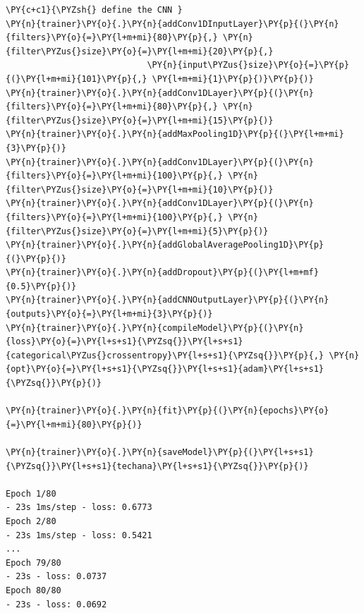 \begin{tcolorbox}[breakable, size=fbox, boxrule=1pt, pad at break*=1mm,colback=cellbackground, colframe=cellborder]
\begin{Verbatim}[commandchars=\\\{\}]
\PY{c+c1}{\PYZsh{} define the CNN }
\PY{n}{trainer}\PY{o}{.}\PY{n}{addConv1DInputLayer}\PY{p}{(}\PY{n}{filters}\PY{o}{=}\PY{l+m+mi}{80}\PY{p}{,} \PY{n}{filter\PYZus{}size}\PY{o}{=}\PY{l+m+mi}{20}\PY{p}{,} 
                            \PY{n}{input\PYZus{}size}\PY{o}{=}\PY{p}{(}\PY{l+m+mi}{101}\PY{p}{,} \PY{l+m+mi}{1}\PY{p}{)}\PY{p}{)}
\PY{n}{trainer}\PY{o}{.}\PY{n}{addConv1DLayer}\PY{p}{(}\PY{n}{filters}\PY{o}{=}\PY{l+m+mi}{80}\PY{p}{,} \PY{n}{filter\PYZus{}size}\PY{o}{=}\PY{l+m+mi}{15}\PY{p}{)}
\PY{n}{trainer}\PY{o}{.}\PY{n}{addMaxPooling1D}\PY{p}{(}\PY{l+m+mi}{3}\PY{p}{)}
\PY{n}{trainer}\PY{o}{.}\PY{n}{addConv1DLayer}\PY{p}{(}\PY{n}{filters}\PY{o}{=}\PY{l+m+mi}{100}\PY{p}{,} \PY{n}{filter\PYZus{}size}\PY{o}{=}\PY{l+m+mi}{10}\PY{p}{)}
\PY{n}{trainer}\PY{o}{.}\PY{n}{addConv1DLayer}\PY{p}{(}\PY{n}{filters}\PY{o}{=}\PY{l+m+mi}{100}\PY{p}{,} \PY{n}{filter\PYZus{}size}\PY{o}{=}\PY{l+m+mi}{5}\PY{p}{)}
\PY{n}{trainer}\PY{o}{.}\PY{n}{addGlobalAveragePooling1D}\PY{p}{(}\PY{p}{)}
\PY{n}{trainer}\PY{o}{.}\PY{n}{addDropout}\PY{p}{(}\PY{l+m+mf}{0.5}\PY{p}{)}
\PY{n}{trainer}\PY{o}{.}\PY{n}{addCNNOutputLayer}\PY{p}{(}\PY{n}{outputs}\PY{o}{=}\PY{l+m+mi}{3}\PY{p}{)}
\PY{n}{trainer}\PY{o}{.}\PY{n}{compileModel}\PY{p}{(}\PY{n}{loss}\PY{o}{=}\PY{l+s+s1}{\PYZsq{}}\PY{l+s+s1}{categorical\PYZus{}crossentropy}\PY{l+s+s1}{\PYZsq{}}\PY{p}{,} \PY{n}{opt}\PY{o}{=}\PY{l+s+s1}{\PYZsq{}}\PY{l+s+s1}{adam}\PY{l+s+s1}{\PYZsq{}}\PY{p}{)}
	
\PY{n}{trainer}\PY{o}{.}\PY{n}{fit}\PY{p}{(}\PY{n}{epochs}\PY{o}{=}\PY{l+m+mi}{80}\PY{p}{)}
	
\PY{n}{trainer}\PY{o}{.}\PY{n}{saveModel}\PY{p}{(}\PY{l+s+s1}{\PYZsq{}}\PY{l+s+s1}{techana}\PY{l+s+s1}{\PYZsq{}}\PY{p}{)}

Epoch 1/80
- 23s 1ms/step - loss: 0.6773
Epoch 2/80
- 23s 1ms/step - loss: 0.5421
...
Epoch 79/80
- 23s - loss: 0.0737
Epoch 80/80
- 23s - loss: 0.0692
\end{Verbatim}
\end{tcolorbox}

